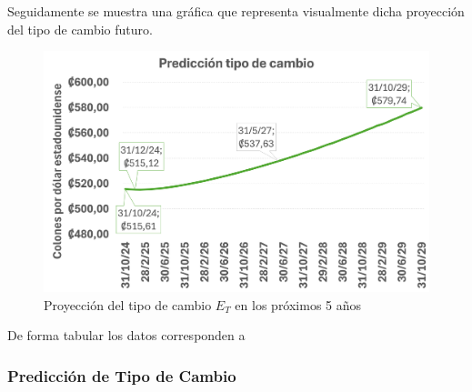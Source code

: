 \documentclass[12pt]{article}
\begin{document}
Seguidamente se muestra una gráfica que representa visualmente dicha proyección del tipo de cambio futuro.
\begin{figure}[H]
    \centering
    \includegraphics[width=1\linewidth]{grafico_tipo_de_cambio.png}
    \caption{Proyección del tipo de cambio \( E_T \) en los próximos 5 años}
    \label{fig:enter-label}
\end{figure}
De forma tabular los datos corresponden a 

\begin{center}
    \subsubsection*{Predicción de Tipo de Cambio}
\end{center}
\end{document}
